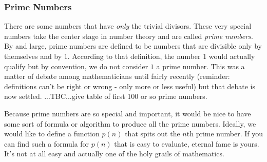 \subsubsection{Prime Numbers}
There are some numbers that have \emph{only} the trivial divisors. These very special numbers take the center stage in number theory and are called \emph{prime numbers}. By and large, prime numbers are defined to be numbers that are divisible only by themselves and by $1$. According to that definition, the number $1$ would actually qualify but by convention, we do not consider $1$ a prime number. This was a matter of debate among mathematicians until fairly recently (reminder: definitions can't be right or wrong - only more or less useful) but that debate is now settled.
...TBC...give table of first 100 or so prime numbers.


\medskip
Because prime numbers are so special and important, it would be nice to have some sort of formula or algorithm to produce all the prime numbers. Ideally, we would like to define a function $p(n)$ that spits out the $n$th prime number. If you can find such a formula for $p(n)$ that is easy to evaluate, eternal fame is yours. It's not at all easy and actually one of the holy grails of mathematics.



